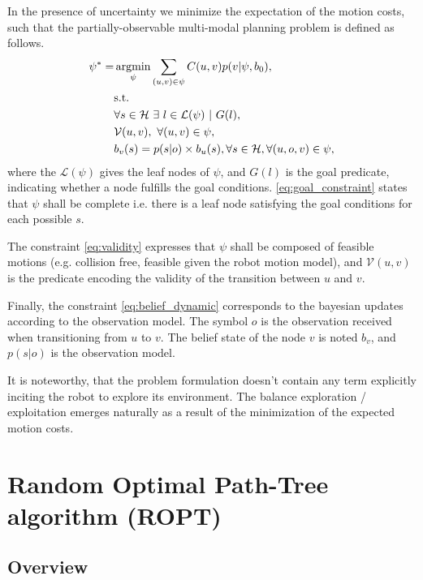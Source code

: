 \documentclass[letterpaper, 10 pt, conference]{ieeeconf}  %
\DeclareMathOperator*{\argmin}{argmin} %
\begin{document}
In the presence of uncertainty we minimize the expectation of the motion costs, such that the partially-observable multi-modal planning problem is defined as follows.
\begin{subequations}
\label{eq:optimization_objective}
\begin{align}
\psi^* = &\argmin_{\psi} \sum_{(u, v) \in \psi} C(u, v) p(v | \psi, b_0), \label{eq:cost_min}\\
&\text{s.t.} \notag \\
&\forall s \in \mathcal{H}\ \exists\ l \in \mathcal{L}(\psi) \ |\ G(l), \label{eq:goal_constraint}\\
&\mathcal{V}(u, v), \ \forall (u, v) \in \psi \label{eq:validity}, \\
&b_v(s) = p(s | o) \times b_u(s), \forall s \in \mathcal{H}, \forall (u, o, v) \in \psi, \label{eq:belief_dynamic}
\end{align}
\end{subequations}
where the $\mathcal{L}(\psi)$ gives the leaf nodes of $\psi$, and $G(l)$ is the goal predicate, indicating whether a node fulfills the goal conditions. \ref{eq:goal_constraint} states that $\psi$ shall be complete i.e. there is a leaf node satisfying the goal conditions for each possible $s$.

The constraint \ref{eq:validity} expresses that $\psi$ shall be composed of feasible motions (e.g. collision free, feasible given the robot motion model), and $\mathcal{V}(u, v)$ is the predicate encoding the validity of the transition between $u$ and $v$.

Finally, the constraint \ref{eq:belief_dynamic} corresponds to the bayesian updates according to the observation model. The symbol $o$ is the observation received when transitioning from $u$ to $v$. The belief state of the node $v$ is noted $b_v$, and $p(s|o)$ is the observation model.

It is noteworthy, that the problem formulation doesn't contain any term explicitly inciting the robot to explore its environment. The balance exploration / exploitation emerges naturally as a result of the minimization of the expected motion costs.

\section{Random Optimal Path-Tree algorithm (ROPT)}

\subsection{Overview}
\end{document}

